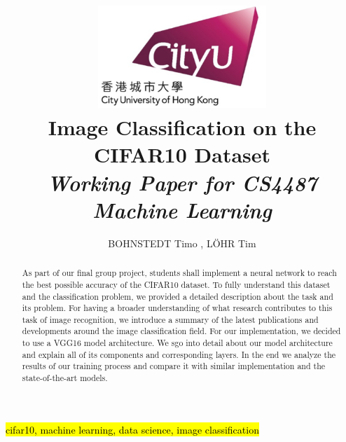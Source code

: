 \documentclass[journal]{IEEEtran}
\begin{document}
    \title{\includegraphics[width=2.5in]{photo/0_cityu} \\
    Image Classification on the CIFAR10 Dataset\\
     \textit{Working Paper for CS4487 Machine Learning}
     }
  \author{BOHNSTEDT 	Timo ,
      L\"OHR Tim\\ 
}

\maketitle
\begin{abstract}
As part of our final group project, students shall implement a neural network to reach the best possible accuracy of the CIFAR10 dataset. To fully understand this dataset and the classification problem, we provided a detailed description about the task and its problem. For having a broader understanding of what research contributes to this task of image recognition, we introduce a summary of the latest publications and developments around the image classification field. For our implementation, we decided to use a VGG16 model architecture. We sgo into detail about our model architecture and explain all of its components and corresponding layers. In the end we analyze the results of our training process and compare it with similar implementation and the state-of-the-art models. 
\end{abstract}

\begin{IEEEkeywords}
\hl{cifar10, machine learning, data science, image classification}
\end{IEEEkeywords}

\IEEEpeerreviewmaketitle

\end{document}

